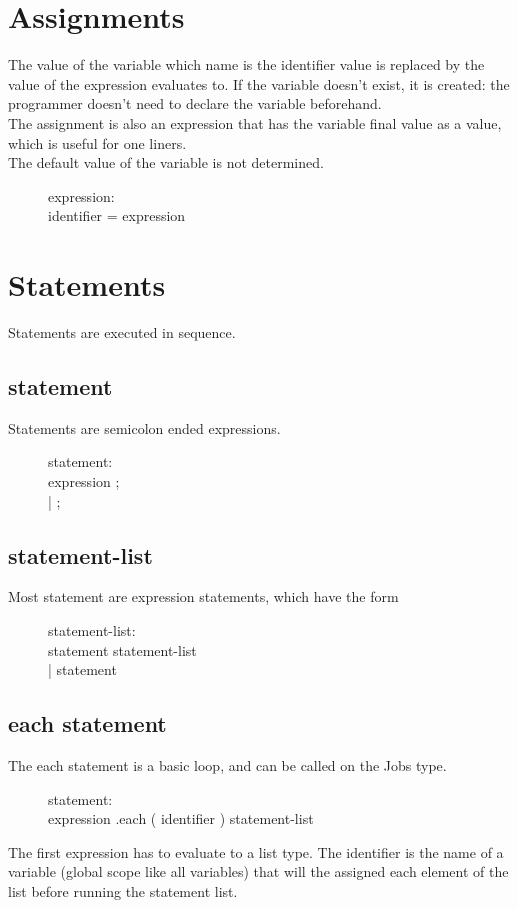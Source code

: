 \documentclass[12pt]{article}
\begin{document}
\section{Assignments}
The value of the variable which name is the identifier value is replaced by the value of the expression
evaluates to. If the variable doesn't exist, it is created: the programmer doesn't need to declare the
variable beforehand.\\
The assignment is also an expression that has the variable final value as a value, which is useful for
one liners.\\
The default value of the variable is not determined.
\begin{description}
  \item[]expression: \hfill \\
    identifier = expression
\end{description}

\section{Statements}
Statements are executed in sequence.

\subsection{statement}
Statements are semicolon ended expressions.
\begin{description}
  \item[]statement: \hfill \\
    expression ; \\
    | ;
\end{description}

\subsection{statement-list}
Most statement are expression statements, which have the form
\begin{description}
  \item[]statement-list: \hfill \\
    statement statement-list \\
    | statement
\end{description}

\subsection{each statement}
The each statement is a basic loop, and can be called on the Jobs type.
\begin{description}
  \item[]statement: \hfill \\
    expression .each ( identifier ) { statement-list }
\end{description}
The first expression has to evaluate to a list type. The identifier is the name
of a variable (global scope like all variables) that will the assigned each
element of the list before running the statement list.
\end{document}

